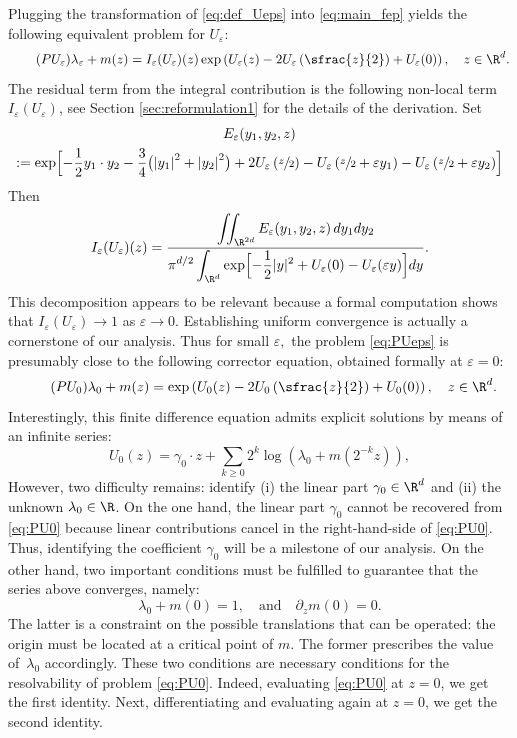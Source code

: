 \documentclass[10pt]{amsart}
\theoremstyle{plain}
\theoremstyle{definition}
\let\eps\varepsilon
\let\ds\displaystyle
\newcommand{\abs}[1]{\left\lvert#1\right\rvert}
\begin{document}
Plugging the transformation of \eqref{eq:def_Ueps} into \eqref{eq:main_fep} yields the following equivalent problem for $U_\eps$:
\begin{equation}
\label{eq:PUeps}\tag{$PU_\eps$} \lambda_\eps + m(z) = I_\eps(U_\eps)(z) \exp \left(U_\eps(z)-2U_\eps\left(\sfrac{z}{2} \right) + U_\eps(0) \right), \quad z \in \R^d.
\end{equation}
The residual term from the integral contribution is the following non-local term $I_\eps(U_\eps)$, see Section \ref{sec:reformulation1} for the details of the derivation. Set
\begin{multline*}
E_\eps(y_1,y_2,z)\\
:=\exp \Bigl[-\dfrac{1}{2}y_1 \cdot y_2 - \dfrac{3}{4}\bigl (\abs{y_1}^2+\abs{y_2}^2 \bigr) +2 U_\eps\left(\sfrac{z}{2} \right) - U_\eps\left(\sfrac{z}{2}+\eps y_1 \right) - U_\eps\left(\sfrac{z}{2} +\eps y_2\right) \Bigr]
\end{multline*}
Then
\begin{equation}\label{eq:def_Ieps_int}
I_\eps(U_\eps)(z)= \dfrac{\ds \iint_{\R^{2d}} E_\eps(y_1,y_2,z)\, d y_1 d y_2 }
{\ds \pi^{d/2} \int_{\R^d} \exp\Bigl[ - \frac12 |y|^2 + U_\eps(0)- U_\eps(\eps y) \Bigr] d y}.
\end{equation}
This decomposition appears to be relevant because a formal computation shows that $I_\eps(U_\eps)\to 1$ as $\eps\to 0$. Establishing uniform convergence is actually a cornerstone of our analysis. Thus for small $\eps,$ the problem \eqref{eq:PUeps} is presumably close to the following corrector equation, obtained formally at $\eps =0$:
\begin{equation}\label{eq:PU0}\tag{$PU_0$}
\lambda_0 +m(z) = \exp \left(U_0(z)-2U_0\left(\sfrac{z}{2}\right) + U_0(0) \right), \quad z \in \R^d.
\end{equation}
Interestingly, this finite difference equation admits explicit solutions by means of an infinite series:
\begin{equation*}
U_0(z) = \gamma_0\cdot z + \sum_{k\geq 0} 2^k \log \left(\lambda_0 + m(2^{-k}z)\right),
\end{equation*}
However, two difficulty remains: identify (i) the linear part $\gamma_0\in\R^d$ and (ii) the unknown $\lambda_0\in\R$.
On the one hand, the linear part $\gamma_0$ cannot be recovered from \eqref{eq:PU0} because linear contributions cancel in the right-hand-side of \eqref{eq:PU0}. Thus, identifying the coefficient $\gamma_0$ will be a milestone of our analysis. On the other hand, two important conditions must be fulfilled to guarantee that the series above converges, namely:
\[ \lambda_0 + m(0) = 1,\quad \text{and} \quad \partial_z m(0) = 0.\]
The latter is a constraint on the possible translations that can be operated: the origin must be located at a critical point of $m$. The former prescribes the value of~$\lambda_0$ accordingly. These two conditions are necessary conditions for the resolvability of problem \eqref{eq:PU0}. Indeed, evaluating \eqref{eq:PU0} at $z=0$, we get the first identity. Next, differentiating and evaluating again at $z = 0$, we get the second identity.
\end{document}
